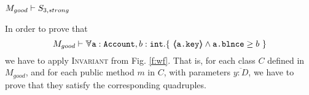 \begin{lemma}
\label{lemma:S3}
\label{l:Mgood:S3}
$M_{good} \vdash S_{3,strong}$
\end{lemma}
\begin{proofO}
In order to prove that 
$$M_{good} \vdash \TwoStatesN {\prg{a}:\prg{Account}, b:\prg{int} }{\  \inside{\prg{\prg{a.key}}} \wedge \prg{a.\balance}\geq b\ }$$
we have to apply  \textsc{Invariant} from Fig. \ref{f:wf}.
 That is, for each  class $C$  defined in $M_{good}$, and for each public method $m$ in $C$, with parameters $\overline{y:D}$, we have to prove that they satisfy the corresponding quadruples.
 




\end{proofO}
